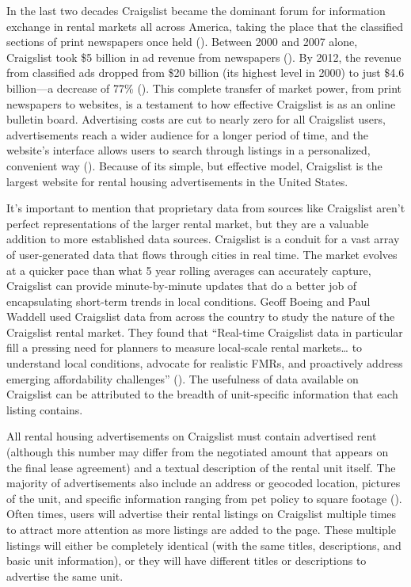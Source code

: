 \documentclass[12pt,english]{article}
\begin{document}
In the last two decades Craigslist became the dominant forum for information exchange in rental markets all across America, taking the place that the classified sections of print newspapers once held (\citet{Kuk2021}). Between 2000 and 2007 alone, Craigslist took \$5 billion in ad revenue from newspapers (\citet{Boeing2017}). By 2012, the revenue from classified ads dropped from \$20 billion (its highest level in 2000) to just \$4.6 billion—a decrease of 77\% (\citet{Johnson20}).  This complete transfer of market power, from print newspapers to websites, is a testament to how effective Craigslist is as an online bulletin board. Advertising costs are cut to nearly zero for all Craigslist users, advertisements reach a wider audience for a longer period of time, and the website’s interface allows users to search through listings in a personalized, convenient way (\citet{Fang2017}). Because of its simple, but effective model, Craigslist is the largest website for rental housing advertisements in the United States.

It’s important to mention that proprietary data from sources like Craigslist aren’t perfect representations of the larger rental market, but they are a valuable addition to more established data sources. Craigslist is a conduit for a vast array of user-generated data that flows through cities in real time. The market evolves at a quicker pace than what 5 year rolling averages can accurately capture, Craigslist can provide minute-by-minute updates that do a better job of encapsulating short-term trends in local conditions. Geoff Boeing and Paul Waddell used Craigslist data from across the country to study the nature of the Craigslist rental market. They found that “Real-time Craigslist data in particular fill a pressing need for planners to measure local-scale rental markets… to understand local conditions, advocate for realistic FMRs, and proactively address emerging affordability challenges” (\citet{Boeing2017}). The usefulness of data available on Craigslist can be attributed to the breadth of unit-specific information that each listing contains. 

All rental housing advertisements on Craigslist must contain advertised rent (although this number may differ from the negotiated amount that appears on the final lease agreement) and a textual description of the rental unit itself. The majority of advertisements also include an address or geocoded location, pictures of the unit, and specific information ranging from pet policy to square footage (\citet{Kuk2021}). Often times, users will advertise their rental listings on Craigslist multiple times to attract more attention as more listings are added to the page. These multiple listings will either be completely identical (with the same titles, descriptions, and basic unit information), or they will have different titles or descriptions to advertise the same unit. 
\end{document}
